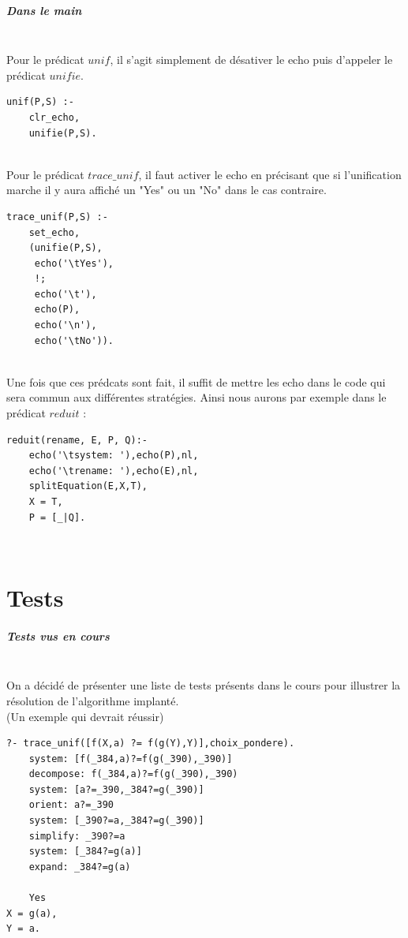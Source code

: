 \documentclass[10pt,a4paper]{report}
\begin{document}
\paragraph{Dans le main} ~\\
Pour le prédicat $unif$, il s'agit simplement de désativer le echo puis d'appeler le prédicat $unifie$.
\begin{lstlisting}[caption ={unif dans $main.pl$}]
unif(P,S) :-
	clr_echo,
	unifie(P,S).
\end{lstlisting} ~\\
Pour le prédicat $trace\_unif$, il faut activer le echo en précisant que si l'unification marche il y aura affiché un "Yes" ou un "No" dans le cas contraire.
\begin{lstlisting}[caption ={trace\_unif dans $main.pl$}]
trace_unif(P,S) :-
	set_echo,
	(unifie(P,S),
	 echo('\tYes'),
	 !;
	 echo('\t'),
	 echo(P),
	 echo('\n'),
	 echo('\tNo')).
\end{lstlisting} ~\\
Une fois que ces prédcats sont fait, il suffit de mettre les echo dans le code qui sera commun aux différentes stratégies. Ainsi nous aurons par exemple dans le prédicat $reduit$ :
\begin{lstlisting}[caption ={Les echos dans $main.pl$}]
reduit(rename, E, P, Q):-
	echo('\tsystem: '),echo(P),nl,
	echo('\trename: '),echo(E),nl,
	splitEquation(E,X,T),
	X = T,
	P = [_|Q].
\end{lstlisting} ~\\




\mbox{}
\newpage
\chapter*{Tests}
\paragraph{Tests vus en cours} ~\\
On a décidé de présenter une liste de tests présents dans le cours pour illustrer la résolution de l'algorithme implanté.\\
(Un exemple qui devrait réussir)
\begin{lstlisting}[caption ={Des tests de cours}]
?- trace_unif([f(X,a) ?= f(g(Y),Y)],choix_pondere).
	system: [f(_384,a)?=f(g(_390),_390)]
	decompose: f(_384,a)?=f(g(_390),_390)
	system: [a?=_390,_384?=g(_390)]
	orient: a?=_390
	system: [_390?=a,_384?=g(_390)]
	simplify: _390?=a
	system: [_384?=g(a)]
	expand: _384?=g(a)

	Yes
X = g(a),
Y = a.
\end{lstlisting} ~\\
\end{document}
